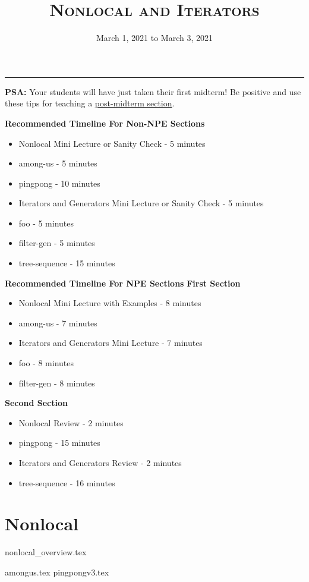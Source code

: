 \documentclass{exam}
\title{\textsc{Nonlocal and Iterators}}
\date{March 1, 2021 to March 3, 2021}
\begin{document}
	\maketitle
	\rule{\textwidth}{0.15em}
	\fontsize{12}{15}\selectfont
	
\begin{guide}
    \textbf{PSA: }Your students will have just taken their first midterm! Be positive and use these tips for teaching a \href{https://docs.google.com/document/d/1Oj0Cmm_HKPOU3YsdBWu1VDF2O1nLYBO_VWaczuGMc8g/edit}{post-midterm section}.

	\textbf{Recommended Timeline For Non-NPE Sections}
	\begin{itemize}
		\item Nonlocal Mini Lecture or Sanity Check - 5 minutes
		\item among-us - 5 minutes
		\item pingpong - 10 minutes
		\item Iterators and Generators Mini Lecture or Sanity Check - 5 minutes
		\item foo - 5 minutes
		\item filter-gen - 5 minutes
		\item tree-sequence - 15 minutes
	\end{itemize}
	\textbf{Recommended Timeline For NPE Sections}
	\textbf{First Section}
	\begin{itemize}
		\item Nonlocal Mini Lecture with Examples - 8 minutes
		\item among-us - 7 minutes
		\item Iterators and Generators Mini Lecture - 7 minutes
		\item foo - 8 minutes
		\item filter-gen - 8 minutes
	\end{itemize}
	\textbf{Second Section}
	\begin{itemize}
		\item Nonlocal Review - 2 minutes
		\item pingpong - 15 minutes
		\item Iterators and Generators Review - 2 minutes
		\item tree-sequence - 16 minutes
	\end{itemize}
\end{guide}

\section{Nonlocal}
{nonlocal_overview.tex}
\begin{questions}
	{amongus.tex}
	{pingpongv3.tex}
\end{questions}
\vspace{-4em}
\end{document}
